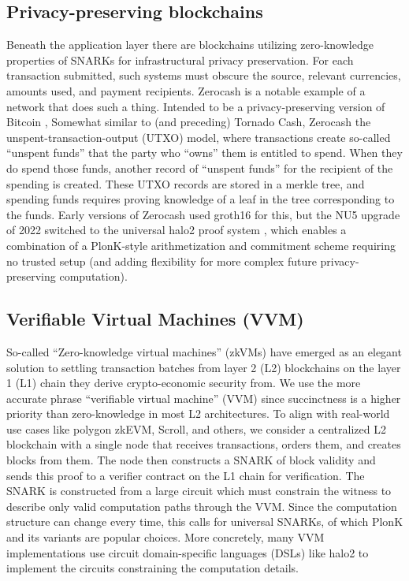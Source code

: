 \subsection{Privacy-preserving blockchains}
\noindent Beneath the application layer there are blockchains utilizing zero-knowledge properties of SNARKs for infrastructural privacy preservation. For each transaction submitted, such systems must obscure the source, relevant currencies, amounts used, and payment recipients. Zerocash \cite{zcash} is a notable example of a network that does such a thing. Intended to be a privacy-preserving version of Bitcoin \cite{bitcoin}, Somewhat similar to (and preceding) Tornado Cash, Zerocash the unspent-transaction-output (UTXO) model, where transactions create so-called ``unspent funds'' that the party who ``owns'' them is entitled to spend. When they do spend those funds, another record of ``unspent funds'' for the recipient of the spending is created. These UTXO records are stored in a merkle tree, and spending funds requires proving knowledge of a leaf in the tree corresponding to the funds. Early versions of Zerocash used groth16 for this, but the NU5 upgrade of 2022 switched to the universal halo2 proof system \cite{halo2}, which enables a combination of a PlonK-style arithmetization and commitment scheme requiring no trusted setup (and adding flexibility for more complex future privacy-preserving computation).

\subsection{Verifiable Virtual Machines (VVM)}
\noindent So-called ``Zero-knowledge virtual machines'' (zkVMs) have emerged as an elegant solution to settling transaction batches from layer 2 (L2) blockchains on the layer 1 (L1) chain they derive crypto-economic security from. We use the more accurate phrase ``verifiable virtual machine'' (VVM) since succinctness is a higher priority than zero-knowledge in most L2 architectures. To align with real-world use cases like polygon zkEVM, Scroll, and others, we consider a centralized L2 blockchain with a single node that receives transactions, orders them, and creates blocks from them. The node then constructs a SNARK of block validity and sends this proof to a verifier contract on the L1 chain for verification. The SNARK is constructed from a large circuit which must constrain the witness to describe only valid computation paths through the VVM. Since the computation structure can change every time, this calls for universal SNARKs, of which PlonK and its variants are popular choices. More concretely, many VVM implementations use circuit domain-specific languages (DSLs) like halo2 to implement the circuits constraining the computation details.\\

